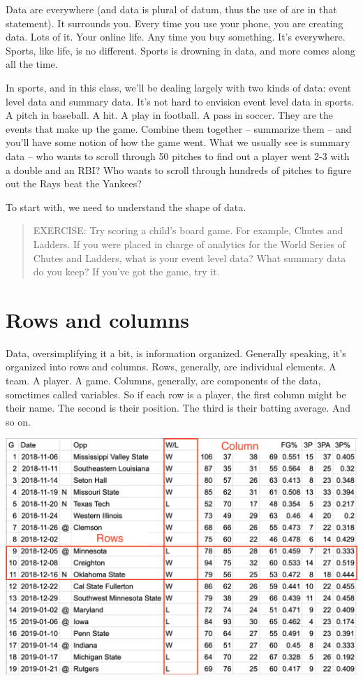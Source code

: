 \documentclass[]{book}
\begin{document}
Data are everywhere (and data is plural of datum, thus the use of are in that statement). It surrounds you. Every time you use your phone, you are creating data. Lots of it. Your online life. Any time you buy something. It's everywhere. Sports, like life, is no different. Sports is drowning in data, and more comes along all the time.

In sports, and in this class, we'll be dealing largely with two kinds of data: event level data and summary data. It's not hard to envision event level data in sports. A pitch in baseball. A hit. A play in football. A pass in soccer. They are the events that make up the game. Combine them together -- summarize them -- and you'll have some notion of how the game went. What we usually see is summary data -- who wants to scroll through 50 pitches to find out a player went 2-3 with a double and an RBI? Who wants to scroll through hundreds of pitches to figure out the Rays beat the Yankees?

To start with, we need to understand the shape of data.

\begin{quote}
EXERCISE: Try scoring a child's board game. For example, Chutes and Ladders. If you were placed in charge of analytics for the World Series of Chutes and Ladders, what is your event level data? What summary data do you keep? If you've got the game, try it.
\end{quote}

\hypertarget{rows-and-columns}{%
\section{Rows and columns}\label{rows-and-columns}}

Data, oversimplifying it a bit, is information organized. Generally speaking, it's organized into rows and columns. Rows, generally, are individual elements. A team. A player. A game. Columns, generally, are components of the data, sometimes called variables. So if each row is a player, the first column might be their name. The second is their position. The third is their batting average. And so on.

\includegraphics[width=22in]{images/data1}
\end{document}
